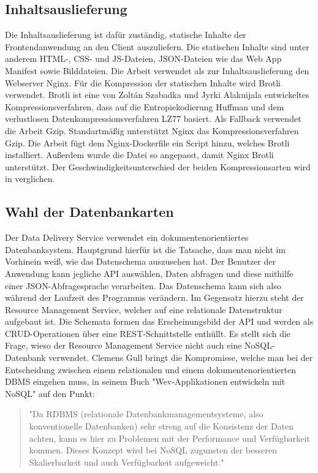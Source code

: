 \subsection{Inhaltsauslieferung}
\label{subsec:inhaltsauslieferung}
Die Inhaltsauslieferung ist dafür zuständig, statische Inhalte der Frontendanwendung
an den Client auszuliefern. Die statischen Inhalte sind unter anderem
HTML-, CSS- und JS-Dateien, JSON-Dateien wie das Web App Manifest sowie Bilddateien.
Die Arbeit verwendet als zur Inhaltsauslieferung den Webserver Nginx. Für die Kompression der statischen
Inhalte wird Brotli verwendet. Brotli ist eine von Zoltán Szabadka
und Jyrki Alakuijala entwickeltes Kompressionsverfahren,
dass auf die Entropiekodierung Huffman und dem verlustlosen
Datenkompressionsverfahren LZ77 basiert.\cite{BrotliGoogleOpenSourceBlog}
Als Fallback verwendet die Arbeit Gzip. Standartmäßig unterstützt Nginx
das Kompressionsverfahren Gzip. Die Arbeit fügt dem Nginx-Dockerfile ein Script
hinzu, welches Brotli installiert. Außerdem wurde die  Datei
so angepasst, damit Nginx Brotli unterstützt. Der Geschwindigkeitsunterschied der
beiden Kompressionsarten wird in  verglichen.

\subsection{Wahl der Datenbankarten}
\label{subsec:wahlderdatenbankarten}
Der Data Delivery Service verwendet ein dokumentenorientiertes Datenbanksystem.
Hauptgrund hierfür ist die Tatsache, dass man nicht im Vorhinein weiß, wie das
Datenschema auszusehen hat. Der Benutzer der Anwendung kann jegliche API
auswählen, Daten abfragen und diese mithilfe einer JSON-Abfragesprache verarbeiten. Das Datenschema
kann sich also während der Laufzeit des Programms verändern. Im Gegensatz hierzu steht der Resource
Management Service, welcher auf eine relationale Datenstruktur aufgebaut ist. Die Schemata formen das
Erscheinungsbild der API und werden als CRUD-Operationen über eine REST-Schnittstelle enthüllt.
Es stellt sich die Frage, wieso der Resource Management Service nicht auch eine NoSQL-Datenbank verwendet.
Clemens Gull bringt die Kompromisse, welche man bei der Entscheidung zwischen einem relationalen
und einem dokumentenorientierten DBMS eingehen muss, in seinem Buch "Wev-Applikationen
entwickeln mit NoSQL" auf den Punkt:

\begin{quote}
"Da RDBMS (relationale Datenbankmanagementsysteme, also konventionelle Datenbanken) sehr streng
auf die Konsistenz der Daten achten, kann es hier zu Problemen mit der Performance und Verfügbarkeit
kommen. Dieses Konzept wird bei NoSQL zugunsten der besseren Skalierbarkeit und auch Verfügbarkeit
aufgeweicht."\cite[S. 18]{NoSQLClemensGull}
\end{quote}

